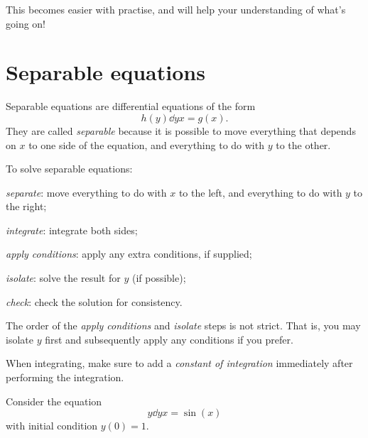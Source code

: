 \documentclass{article}
\begin{document}
This becomes easier with practise, and will help your understanding of
what's going on!

\newpage

\section{Separable equations}

Separable equations are differential equations of the form
\begin{equation} \label{eq:separable}
  h(y) \dd{y}{x} = g(x).
\end{equation}
They are called \emph{separable} because it is possible to move
everything that depends on $x$ to one side of the equation, and
everything to do with $y$ to the other.

To solve separable equations:
\begin{enumerate*}
\item \emph{separate}: move everything to do with $x$ to the left, and
  everything to do with $y$ to the right;
\item \emph{integrate}: integrate both sides;
\item \emph{apply conditions}: apply any extra conditions, if
  supplied;
\item \emph{isolate}: solve the result for $y$ (if possible);
\item \emph{check}: check the solution for consistency.
\end{enumerate*}

The order of the \emph{apply conditions} and \emph{isolate} steps is
not strict.  That is, you may isolate $y$ first and subsequently apply
any conditions if you prefer.

\begin{heads}
  When integrating, make sure to add a \emph{constant of integration}
  immediately after performing the integration.
\end{heads}

\begin{example}
  Consider the equation
  \begin{equation}  \label{eq:ex:separable}
    y \dd{y}{x} = \sin(x)
  \end{equation}
  with initial condition $y(0) = 1$.
\end{example}
\end{document}
